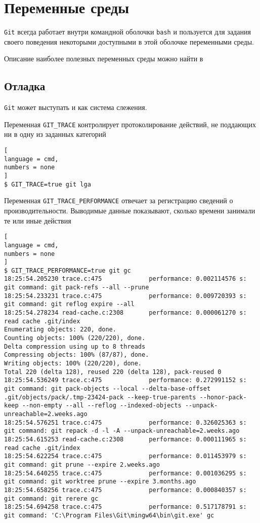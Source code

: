 \documentclass[%
	11pt,
	a4paper,
	utf8,
		]{article}
\begin{document}
\section{Переменные среды}

\texttt{Git} всегда работает внутри командной оболочки \texttt{bash} и пользуется для задания своего поведения некоторыми доступными в этой оболочке переменными среды.

Описание наиболее полезных переменных среды можно найти в \cite[]{chacon:2020}

\subsection{Отладка}

\texttt{Git} может выступать и как система слежения.

Переменная \verb|GIT_TRACE| контролирует протоколирование действий, не поддающих ни в одну из заданных категорий
\begin{lstlisting}[
language = cmd,
numbers = none
]
$ GIT_TRACE=true git lga
\end{lstlisting}

Переменная \verb|GIT_TRACE_PERFORMANCE| отвечает за регистрацию сведений о производительности. Выводимые данные показывают, сколько времени занимали те или иные действия
\begin{lstlisting}[
language = cmd,
numbers = none
]
$ GIT_TRACE_PERFORMANCE=true git gc
18:25:54.205230 trace.c:475             performance: 0.002114576 s: git command: git pack-refs --all --prune
18:25:54.233231 trace.c:475             performance: 0.009720393 s: git command: git reflog expire --all
18:25:54.278234 read-cache.c:2308       performance: 0.000061270 s:  read cache .git/index
Enumerating objects: 220, done.
Counting objects: 100% (220/220), done.
Delta compression using up to 8 threads
Compressing objects: 100% (87/87), done.
Writing objects: 100% (220/220), done.
Total 220 (delta 128), reused 220 (delta 128), pack-reused 0
18:25:54.536249 trace.c:475             performance: 0.272991152 s: git command: git pack-objects --local --delta-base-offset .git/objects/pack/.tmp-23424-pack --keep-true-parents --honor-pack-keep --non-empty --all --reflog --indexed-objects --unpack-unreachable=2.weeks.ago
18:25:54.576251 trace.c:475             performance: 0.326025363 s: git command: git repack -d -l -A --unpack-unreachable=2.weeks.ago
18:25:54.615253 read-cache.c:2308       performance: 0.000111965 s:  read cache .git/index
18:25:54.622254 trace.c:475             performance: 0.011453979 s: git command: git prune --expire 2.weeks.ago
18:25:54.640255 trace.c:475             performance: 0.001036295 s: git command: git worktree prune --expire 3.months.ago
18:25:54.658256 trace.c:475             performance: 0.000840357 s: git command: git rerere gc
18:25:54.694258 trace.c:475             performance: 0.517178791 s: git command: 'C:\Program Files\Git\mingw64\bin\git.exe' gc
\end{lstlisting}
\end{document}
